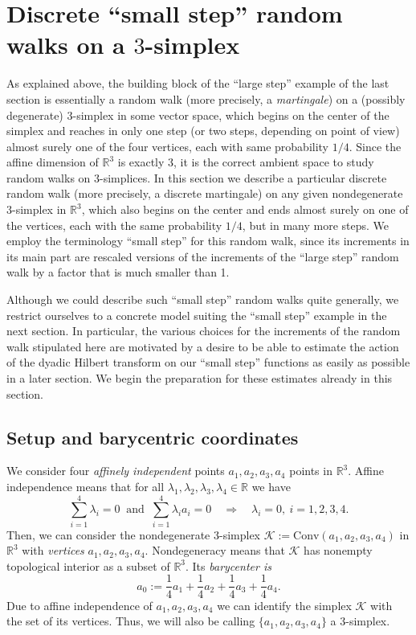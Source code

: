 \documentclass{amsart}
\newcommand{\R}{\mathbb{R}}
\theoremstyle{definition}
\theoremstyle{remark}
\begin{document}
\section{Discrete ``small step'' random walks on a \texorpdfstring{$3$}{3}-simplex}
\label{sec:small_step_random_walks_tetrahedron}

As explained above, the building block of the ``large step'' example of the last section is essentially a random walk (more precisely, a \emph{martingale}) on a (possibly degenerate) $3$-simplex in some vector space, which begins on the center of the simplex and reaches in only one step (or two steps, depending on point of view) almost surely one of the four vertices, each with same probability $1/4$. Since the affine dimension of $\R^3$ is exactly 3, it is the correct ambient space to study random walks on $3$-simplices. In this section we describe a particular discrete random walk (more precisely, a discrete martingale) on any given nondegenerate $3$-simplex in $\R^3$, which also begins on the center and ends almost surely on one of the vertices, each with the same probability $1/4$, but in many more steps. We employ the terminology ``small step'' for this random walk, since its increments in its main part are rescaled versions of the increments of the ``large step'' random walk by a factor that is much smaller than 1.

Although we could describe such ``small step'' random walks quite generally, we restrict ourselves to a concrete model suiting the ``small step'' example in the next section. In particular, the various choices for the increments of the random walk stipulated here are motivated by a desire to be able to estimate the action of the dyadic Hilbert transform on our ``small step'' functions as easily as possible in a later section. We begin the preparation for these estimates already in this section.

\subsection{Setup and barycentric coordinates}

We consider four \emph{affinely independent} points $a_1,a_2,a_3,a_4$ points in $\R^3$. Affine independence means that for all $\lambda_1,\lambda_2,\lambda_3,\lambda_4\in\R$ we have
\begin{equation*}
    \sum_{i=1}^{4}\lambda_i=0~\text{ and }~\sum_{i=1}^{4}\lambda_ia_i=0\quad\Longrightarrow\quad\lambda_i=0,~i=1,2,3,4.
\end{equation*}
Then, we can consider the nondegenerate $3$-simplex $\mathscr{K}:=\mathrm{Conv}(a_1,a_2,a_3,a_4)$ in $\R^3$ with \emph{vertices} $a_1,a_2,a_3,a_4$. Nondegeneracy means that $\mathscr{K}$ has nonempty topological interior as a subset of $\R^3$. Its \emph{barycenter is}
\begin{equation*}
    a_0:=\frac{1}{4}a_1+\frac{1}{4}a_2+\frac{1}{4}a_3+\frac{1}{4}a_4.
\end{equation*}
Due to affine independence of $a_1,a_2,a_3,a_4$ we can identify the simplex $\mathscr{K}$ with the set of its vertices. Thus, we will also be calling $\{a_1,a_2,a_3,a_4\}$ a $3$-simplex.
\end{document}
